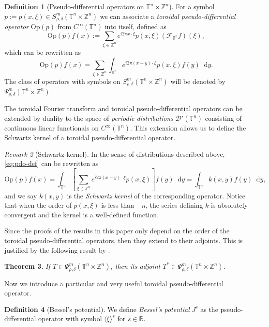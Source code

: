 \documentclass[12pt, reqno]{amsart}
\newtheorem{theorem}{Theorem}[section]
\theoremstyle{definition}
\newtheorem{definition}[theorem]{Definition}
\theoremstyle{remark}
\newtheorem{remark}[theorem]{Remark}
\numberwithin{equation}{section}
\newcommand*\diff{\mathop{}\!\mathrm{d}}
\begin{document}
\begin{definition}[Pseudo-differential operators on $ \mathbb{T}^n \times \mathbb{Z}^n $]
    For a symbol $p:=p(x, \xi) \in S^m_{\rho,\delta} (\mathbb{T}^n\times \mathbb{Z}^n) $ we can associate a \textit{toroidal pseudo-differential operator} $\mathrm{Op}(p)$ from $C^\infty(\mathbb{T}^n)$ into itself, defined as  
    \begin{equation*}
        \mathrm{Op}(p)f(x):=\sum_{\xi \in \mathbb{Z}^n} e^{i2\pi x \cdot \xi}p(x, \xi)(\mathcal{F}_{\mathbb{T}^n}f)(\xi),
    \end{equation*}
    which can be rewritten as 
    \begin{equation}
        \mathrm{Op}(p)f(x)=  \sum_{\xi \in \mathbb{Z}^n} \int_{\mathbb{T}^n} e^{i2\pi (x-y) \cdot \xi} p(x, \xi)f(y) \diff y .
        \label{eq:pdo-def}
    \end{equation}
    The class of operators with symbols on $S^m_{\rho,\delta} (\mathbb{T}^n\times \mathbb{Z}^n) $ will be denoted  by $\Psi^m_{\rho,\delta} (\mathbb{T}^n\times \mathbb{Z}^n) $.
\end{definition}
    The toroidal Fourier transform and toroidal pseudo-differential operators can be extended by duality to the space of \textit{periodic distributions} $\mathcal{D}'(\mathbb{T}^n)$ consisting of continuous linear functionals on $C^\infty(\mathbb{T}^n)$. This extension allows us to define the Schwartz kernel of a toroidal pseudo-differential operator.
\begin{remark}[Schwartz kernel]
    In the sense of distributions described above, \cref{eq:pdo-def} can be rewritten as
    \begin{equation*}
         \mathrm{Op}(p)f(x)=\int_{\mathbb{T}^n}\left[\sum_{\xi \in \mathbb{Z}^n} e^{i2\pi(x - y) \cdot \xi} p(x, \xi)\right]f(y)\diff y = \int_{\mathbb{T}^n}k(x, y)f(y)\diff y,
    \end{equation*}
    and we say $k(x, y)$ is the \textit{Schwartz kernel} of the corresponding operator. Notice that when the order of $p(x, \xi)$ is less than $-n$, the series defining $k$ is absolutely convergent and the kernel is a well-defined function.
\end{remark}
Since the proofs of the results in this paper only depend on the order of the toroidal pseudo-differential operators, then they extend to their adjoints. This is justified by the following result by \cite[Corollary~4.9.8]{ruzhansky-turunen}.
\begin{theorem}
    If $T \in \Psi^m_{\rho,\delta} (\mathbb{T}^n \times \mathbb{Z}^n) $, then its adjoint $T^* \in \Psi^m_{\rho,\delta} (\mathbb{T}^n \times \mathbb{Z}^n) $.
\end{theorem}
Now we introduce a particular and very useful toroidal pseudo-differential operator.
\begin{definition}[Bessel's potential]
    We define \textit{Bessel's potential} $J^s$ as the pseudo-differential operator with symbol $\langle\xi\rangle^s$ for $s \in \mathbb{R}$.
\end{definition}
\end{document}
